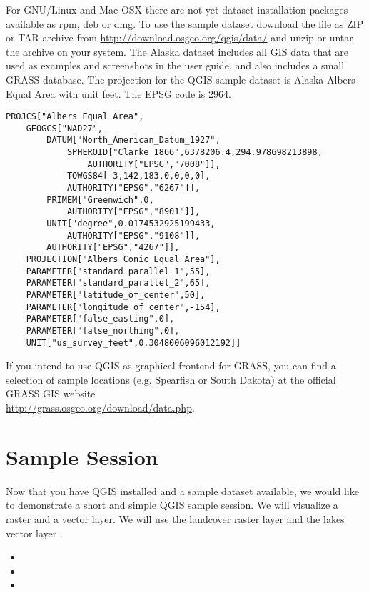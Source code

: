 \nix \osx For GNU/Linux and Mac OSX there are not yet dataset installation
packages available as rpm, deb or dmg. To use the sample dataset download the
file  as ZIP or TAR archive from
\url{http://download.osgeo.org/qgis/data/} and unzip or untar the archive on
your system. The Alaska dataset includes all GIS data that are used as
examples and screenshots in the user guide, and also includes a small GRASS
database. The projection for the QGIS sample dataset is Alaska Albers Equal
Area with unit feet. The EPSG code is 2964.

\begin{verbatim}
PROJCS["Albers Equal Area",
    GEOGCS["NAD27",
        DATUM["North_American_Datum_1927",
            SPHEROID["Clarke 1866",6378206.4,294.978698213898,
                AUTHORITY["EPSG","7008"]],
            TOWGS84[-3,142,183,0,0,0,0],
            AUTHORITY["EPSG","6267"]],
        PRIMEM["Greenwich",0,
            AUTHORITY["EPSG","8901"]],
        UNIT["degree",0.0174532925199433,
            AUTHORITY["EPSG","9108"]],
        AUTHORITY["EPSG","4267"]],
    PROJECTION["Albers_Conic_Equal_Area"],
    PARAMETER["standard_parallel_1",55],
    PARAMETER["standard_parallel_2",65],
    PARAMETER["latitude_of_center",50],
    PARAMETER["longitude_of_center",-154],
    PARAMETER["false_easting",0],
    PARAMETER["false_northing",0],
    UNIT["us_survey_feet",0.3048006096012192]]
\end{verbatim}

If you intend to use QGIS as graphical frontend for GRASS, you can find a
selection of sample locations (e.g. Spearfish or South Dakota) at the
official GRASS GIS website \\
\url{http://grass.osgeo.org/download/data.php}. 

\section{Sample Session}\label{samplesession}

Now that you have QGIS installed and a sample dataset available, we would 
like to demonstrate a short and simple QGIS sample session. We will visualize 
a raster and a vector layer. We will use the landcover raster 
layer  and the lakes 
vector layer .


\begin{itemize}
\item {}
\item {}
\item {}
\end{itemize} 


